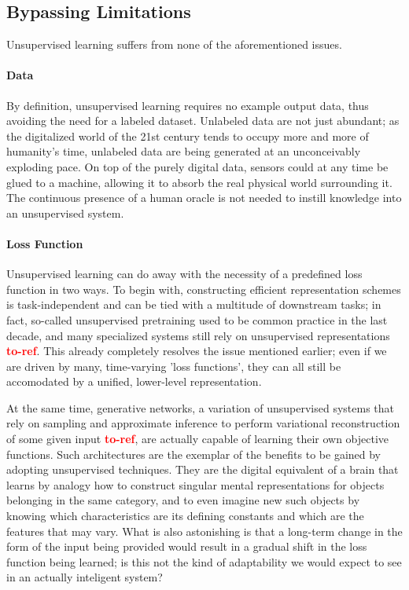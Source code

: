 \documentclass[]{article}
\newcommand\toref{\textcolor{red}{\bf{to-ref}}}
\begin{document}
\subsection{Bypassing Limitations}
Unsupervised learning suffers from none of the aforementioned issues. 

\paragraph{Data}
By definition, unsupervised learning requires no example output data, thus avoiding the need for a labeled dataset. Unlabeled data are not just abundant; as the digitalized world of the 21st century tends to occupy more and more of humanity's time, unlabeled data are being generated at an unconceivably exploding pace. On top of the purely digital data, sensors could at any time be glued to a machine, allowing it to absorb the real physical world surrounding it. The continuous presence of a human oracle is not needed to instill knowledge into an unsupervised system.

\paragraph{Loss Function}
Unsupervised learning can do away with the necessity of a predefined loss function in two ways. To begin with, constructing efficient representation schemes is task-independent and can be tied with a multitude of downstream tasks; in fact, so-called unsupervised pretraining used to be common practice in the last decade, and many specialized systems still rely on unsupervised representations \toref . This already completely resolves the issue mentioned earlier; even if we are driven by many, time-varying 'loss functions', they can all still be accomodated by a unified, lower-level representation.

At the same time, generative networks, a variation of unsupervised systems that rely on sampling and approximate inference to perform variational reconstruction of some given input \toref , are actually capable of learning their own objective functions. Such architectures are the exemplar of the benefits to be gained by adopting unsupervised techniques. They are the digital equivalent of a brain that learns by analogy how to construct singular mental representations for objects belonging in the same category, and to even imagine new such objects by knowing which characteristics are its defining constants and which are the features that may vary. What is also astonishing is that a long-term change in the form of the input being provided would result in a gradual shift in the loss function being learned; is this not the kind of adaptability we would expect to see in an actually inteligent system?
\end{document}
